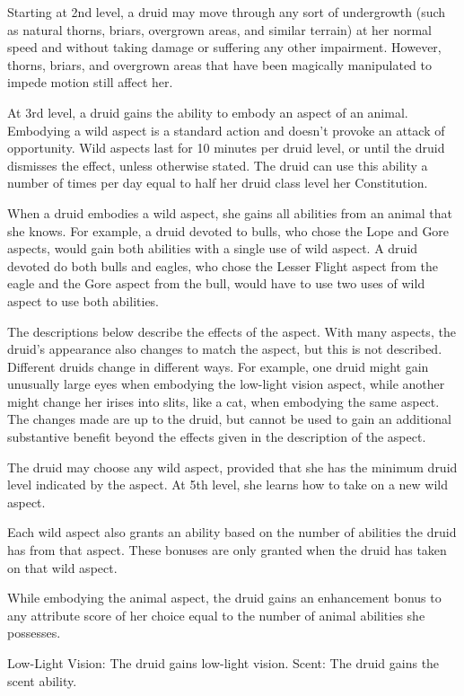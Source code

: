  Starting at 2nd level, a druid may move through any sort of undergrowth (such as natural thorns, briars, overgrown areas, and similar terrain) at her normal speed and without taking damage or suffering any other impairment. However, thorns, briars, and overgrown areas that have been magically manipulated to impede motion still affect her.

  At 3rd level, a druid gains the ability to embody an aspect of an animal. Embodying a wild aspect is a standard action and doesn't provoke an attack of opportunity. Wild aspects last for 10 minutes per druid level, or until the druid dismisses the effect, unless otherwise stated. The druid can use this ability a number of times per day equal to half her druid class level \add her Constitution.
\par When a druid embodies a wild aspect, she gains all abilities from an animal that she knows. For example, a druid devoted to bulls, who chose the Lope and Gore aspects, would gain both abilities with a single use of wild aspect. A druid devoted do both bulls and eagles, who chose the Lesser Flight aspect from the eagle and the Gore aspect from the bull, would have to use two uses of wild aspect to use both abilities.
\par The descriptions below describe the effects of the aspect. With many aspects, the druid's appearance also changes to match the aspect, but this is not described. Different druids change in different ways. For example, one druid might gain unusually large eyes when embodying the low-light vision aspect, while another might change her irises into slits, like a cat, when embodying the same aspect. The changes made are up to the druid, but cannot be used to gain an additional substantive benefit beyond the effects given in the description of the aspect.
\par The druid may choose any wild aspect, provided that she has the minimum druid level indicated by the aspect. At 5th level, she learns how to take on a new wild aspect. 
\par Each wild aspect also grants an ability based on the number of abilities the druid has from that aspect. These bonuses are only granted when the druid has taken on that wild aspect.

While embodying the animal aspect, the druid gains an enhancement bonus to any attribute score of her choice equal to the number of animal abilities she possesses.
\begin{wildaspect}
\wilditem Low-Light Vision: The druid gains low-light vision.
\wilditem Scent: The druid gains the scent ability.
\end{wildaspect}

